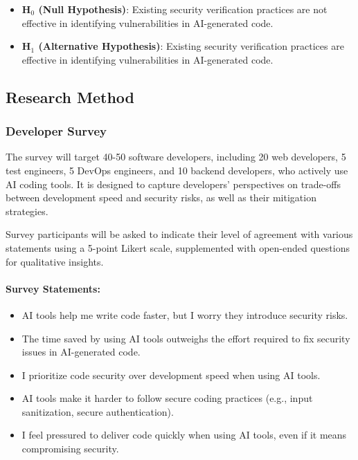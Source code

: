 \begin{itemize}
    \item \textbf{H$_{0}$ (Null Hypothesis)}: Existing security verification practices are not effective in identifying vulnerabilities in AI-generated code.
    \item \textbf{H$_{1}$ (Alternative Hypothesis)}: Existing security verification practices are effective in identifying vulnerabilities in AI-generated code.
\end{itemize}

\subsection{Research Method}

\subsubsection{Developer Survey}

The survey will target 40-50 software developers, including 20 web developers, 5 test engineers, 5 DevOps engineers, and 10 backend developers, who actively use AI coding tools. It is designed to capture developers' perspectives on trade-offs between development speed and security risks, as well as their mitigation strategies.

Survey participants will be asked to indicate their level of agreement with various statements using a 5-point Likert scale, supplemented with open-ended questions for qualitative insights.

\paragraph{Survey Statements:}
\begin{itemize}
    \item AI tools help me write code faster, but I worry they introduce security risks.
    \item The time saved by using AI tools outweighs the effort required to fix security issues in AI-generated code.
    \item I prioritize code security over development speed when using AI tools.
    \item AI tools make it harder to follow secure coding practices (e.g., input sanitization, secure authentication).
    \item I feel pressured to deliver code quickly when using AI tools, even if it means compromising security.
\end{itemize}

